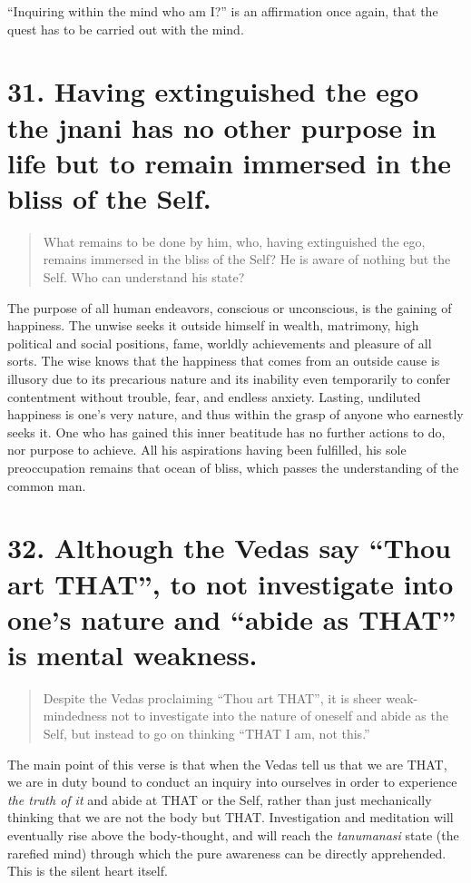 \documentclass[12pt]{report}
\begin{document}
``Inquiring within the mind who am I?'' is an affirmation once again,
that the quest has to be carried out with the mind.

\section{31. Having extinguished the ego the jnani has no other purpose in life but to remain immersed in the bliss of the Self.}

\begin{quote}
  What remains to be done by him, who, having extinguished the ego,
  remains immersed in the bliss of the Self? He is aware of nothing
  but the Self. Who can understand his state?
\end{quote}


The purpose of all human endeavors, conscious or unconscious, is the
gaining of happiness. The unwise seeks it outside himself in wealth,
matrimony, high political and social positions, fame, worldly
achievements and pleasure of all sorts. The wise knows that the
happiness that comes from an outside cause is illusory due to its
precarious nature and its inability even temporarily to confer
contentment without trouble, fear, and endless anxiety. Lasting,
undiluted happiness is one's very nature, and thus within the grasp of
anyone who earnestly seeks it. One who has gained this inner beatitude
has no further actions to do, nor purpose to achieve. All his
aspirations having been fulfilled, his sole preoccupation remains that
ocean of bliss, which passes the understanding of the common man.

\section{32. Although the Vedas say ``Thou art THAT'', to not investigate into one's nature and ``abide as THAT'' is mental weakness.}

\begin{quote}
  Despite the Vedas proclaiming ``Thou art THAT'', it is sheer
  weak-mindedness not to investigate into the nature of oneself and
  abide as the Self, but instead to go on thinking ``THAT I am, not
  this.'' 
\end{quote}


The main point of this verse is that when the Vedas tell us that we
are THAT, we are in duty bound to conduct an inquiry into ourselves in
order to experience \emph{the truth of it} and abide at THAT or the
Self, rather than just mechanically thinking that we are not the body
but THAT. Investigation and meditation will eventually rise above the
body-thought, and will reach the \emph{tanumanasi} state (the rarefied
mind) through which the pure awareness can be directly
apprehended. This is the silent heart itself.
\end{document}
